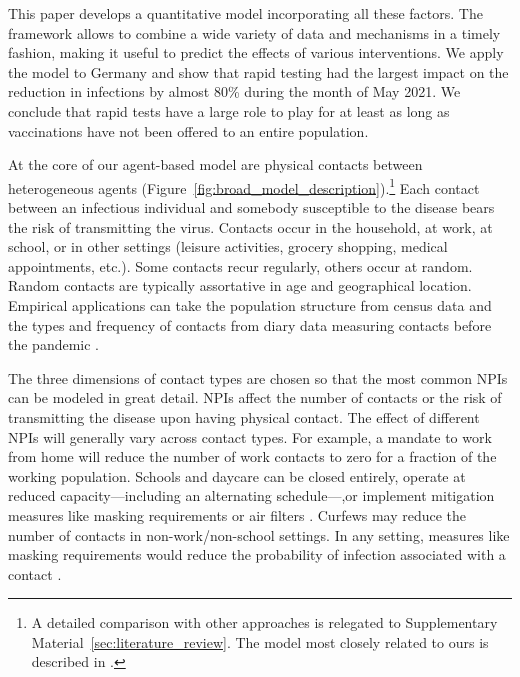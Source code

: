 This paper develops a quantitative model incorporating all these factors. The framework
allows to combine a wide variety of data and mechanisms in a timely fashion, making it
useful to predict the effects of various interventions. We apply the model to Germany
and show that rapid testing had the largest impact on the reduction in infections by
almost 80\% during the month of May 2021. We conclude that rapid tests have a large role
to play for at least as long as vaccinations have not been offered to an entire
population.

At the core of our agent-based model are physical contacts between heterogeneous agents
(Figure~\ref{fig:broad_model_description}).\footnote{A detailed comparison with other
approaches  is relegated to Supplementary Material~\ref{sec:literature_review}. The
model most closely related to ours is described in \citet{Hinch2020}.} Each contact
between an infectious individual and somebody susceptible to the disease bears the risk
of transmitting the virus. Contacts occur in the household, at work, at school, or in
other settings (leisure activities, grocery shopping, medical appointments, etc.). Some
contacts recur regularly, others occur at random. Random contacts are typically
assortative in age and geographical location. Empirical applications can take the
population structure from census data and the types and frequency of contacts from diary
data measuring contacts before the pandemic \citep[e.g.][]{Mossong2008,Hoang2019}.

The three dimensions of contact types are chosen so that the most common NPIs can be
modeled in great detail. NPIs affect the number of contacts or the risk of transmitting
the disease upon having physical contact. The effect of different NPIs will generally
vary across contact types. For example, a mandate to work from home will reduce the
number of work contacts to zero for a fraction of the working population. Schools and
daycare can be closed entirely, operate at reduced capacity---including an alternating
schedule---,or implement mitigation measures like masking requirements or air filters
\citep{Lessler2021}. Curfews may reduce the number of contacts in non-work/non-school
settings. In any setting, measures like masking requirements would reduce the
probability of infection associated with a contact \citep{Cheng2021}.

